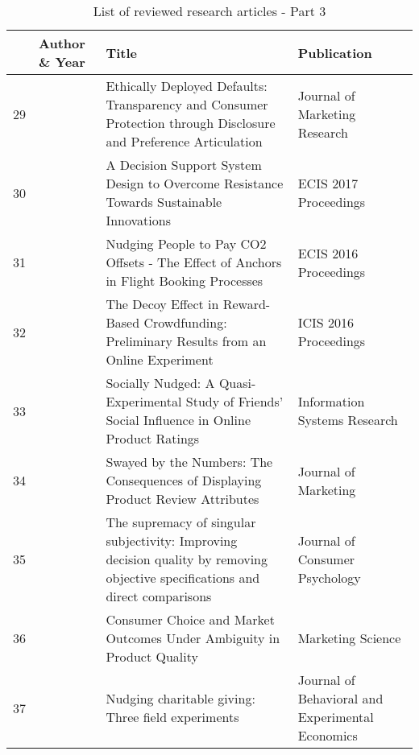 \begin{table}[h!]
\small
\begin{tabular}{|l|p{}|p{}|p{}|}
\hline
 & \textbf{Author \& Year} & \textbf{Title} & \textbf{Publication} \\ \hline
29 & \cite{steffel_ethically_2016} & Ethically Deployed Defaults: Transparency and Consumer Protection through Disclosure and Preference Articulation & Journal of Marketing Research \\ \hline
30 & \cite{stryja_decision_2017} & A Decision Support System Design to Overcome Resistance Towards Sustainable Innovations & ECIS 2017 Proceedings \\ \hline
31 & \cite{szekely_nudging_2016} & Nudging People to Pay CO2 Offsets - The Effect of Anchors in Flight Booking Processes & ECIS 2016 Proceedings \\ \hline
32 & \cite{tietz_decoy_2016} & The Decoy Effect in Reward-Based Crowdfunding: Preliminary Results from an Online Experiment & ICIS 2016 Proceedings \\ \hline
33 & \cite{wang_socially_2018} & Socially Nudged: A Quasi-Experimental Study of Friends’ Social Influence in Online Product Ratings & Information Systems Research \\ \hline
34 & \cite{watson_swayed_2018} & Swayed by the Numbers: The Consequences of Displaying Product Review Attributes & Journal of Marketing \\ \hline
35 & \cite{yang_supremacy_2011} & The supremacy of singular subjectivity: Improving decision quality by removing objective specifications and direct comparisons & Journal of Consumer Psychology \\ \hline
36 & \cite{yoo_consumer_2018} & Consumer Choice and Market Outcomes Under Ambiguity in Product Quality & Marketing Science \\ \hline
37 & \cite{zarghamee_nudging_2017} & Nudging charitable giving: Three field experiments & Journal of Behavioral and Experimental Economics \\ \hline

\end{tabular}
\caption{List of reviewed research articles - Part 3}
\label{table:articles-3}
\end{table}

\newpage

